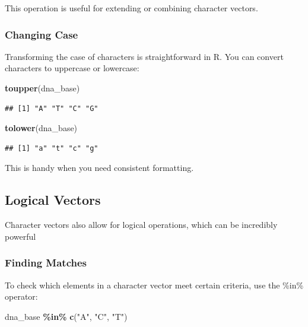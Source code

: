 \documentclass[
]{book}
\newenvironment{Shaded}{\begin{snugshade}}{\end{snugshade}}
\newcommand{\FunctionTok}[1]{\textcolor[rgb]{0.13,0.29,0.53}{\textbf{#1}}}
\newcommand{\NormalTok}[1]{#1}
\newcommand{\SpecialCharTok}[1]{\textcolor[rgb]{0.81,0.36,0.00}{\textbf{#1}}}
\newcommand{\StringTok}[1]{\textcolor[rgb]{0.31,0.60,0.02}{#1}}
\begin{document}
This operation is useful for extending or combining character vectors.

\hypertarget{changing-case}{%
\subsubsection{Changing Case}\label{changing-case}}

Transforming the case of characters is straightforward in R. You can convert characters to uppercase or lowercase:

\begin{Shaded}
\begin{Highlighting}[]
\FunctionTok{toupper}\NormalTok{(dna\_base)}
\end{Highlighting}
\end{Shaded}

\begin{verbatim}
## [1] "A" "T" "C" "G"
\end{verbatim}

\begin{Shaded}
\begin{Highlighting}[]
\FunctionTok{tolower}\NormalTok{(dna\_base)}
\end{Highlighting}
\end{Shaded}

\begin{verbatim}
## [1] "a" "t" "c" "g"
\end{verbatim}

This is handy when you need consistent formatting.

\hypertarget{logical-vectors}{%
\subsection{Logical Vectors}\label{logical-vectors}}

Character vectors also allow for logical operations, which can be incredibly powerful

\hypertarget{finding-matches}{%
\subsubsection{Finding Matches}\label{finding-matches}}

To check which elements in a character vector meet certain criteria, use the \%in\% operator:

\begin{Shaded}
\begin{Highlighting}[]
\NormalTok{dna\_base }\SpecialCharTok{\%in\%} \FunctionTok{c}\NormalTok{(}\StringTok{"A"}\NormalTok{, }\StringTok{"C"}\NormalTok{, }\StringTok{"T"}\NormalTok{)}
\end{Highlighting}
\end{Shaded}
\end{document}
